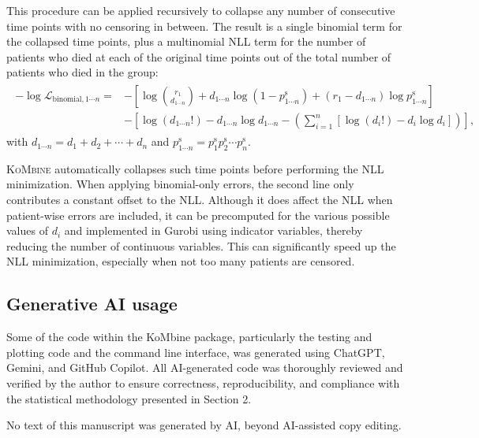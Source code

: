 \documentclass[pdflatex,sn-basic]{sn-jnl}%
\theoremstyle{thmstyleone}%
\theoremstyle{thmstyletwo}%
\theoremstyle{thmstylethree}%
\newcommand{\KoMbine}{\textsc{KoMbine}}
\newcommand{\Gurobi}{Gurobi}
\begin{document}
\begin{appendices}
This procedure can be applied recursively to collapse any number of consecutive time points with no censoring in between. The result is a single binomial term for the collapsed time points, plus a multinomial NLL term for the number of patients who died at each of the original time points out of the total number of patients who died in the group:
\begin{align}
\begin{aligned}
-\log \mathcal{L}_{\text{binomial},1 \cdots n} =&-\left[\log\binom{r_1}{d_{1 \cdots n}} + d_{1 \cdots n} \log \left(1-p_{1 \cdots n}^\text{s}\right) + (r_1-d_{1 \cdots n}) \log p_{1 \cdots n}^\text{s}\right] \\
&-\left[\log{(d_{1 \cdots n}!)}-d_{1 \cdots n}\log d_{1 \cdots n} - \left(\sum_{i=1}^n \left[\log{(d_i!)} - d_i \log d_i\right]\right)\right],
\end{aligned}
\end{align}
with \(d_{1 \cdots n} = d_1 + d_2 + \cdots + d_n\) and \(p_{1 \cdots n}^\text{s} = p_1^\text{s} p_2^\text{s} \cdots p_n^\text{s}\)\@.

\KoMbine{} automatically collapses such time points before performing the NLL minimization. When applying binomial-only errors, the second line only contributes a constant offset to the NLL\@. Although it does affect the NLL when patient-wise errors are included, it can be precomputed for the various possible values of \(d_i\) and implemented in \Gurobi{} using indicator variables, thereby reducing the number of continuous variables. This can significantly speed up the NLL minimization, especially when not too many patients are censored.

\subsection{Generative AI usage}

Some of the code within the KoMbine package, particularly the testing and plotting code and the command line interface, was generated using ChatGPT, Gemini, and GitHub Copilot. All AI-generated code was thoroughly reviewed and verified by the author to ensure correctness, reproducibility, and compliance with the statistical methodology presented in Section 2.

No text of this manuscript was generated by AI, beyond AI-assisted copy editing.

\end{appendices}


\end{document}
